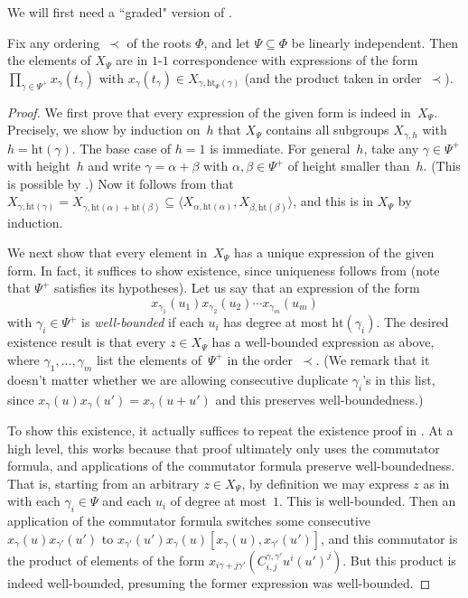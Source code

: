 \documentclass[11pt]{article}
\newcommand{\hgt}{{\mathrm{ht}}}
\begin{document}
We will first need a ``graded" version of .
\begin{proposition}\label{substruct}
    Fix any ordering~$\prec$ of the roots $\Phi$, and let $\Psi \subseteq \Phi$ be linearly independent.  Then the elements of $X_{\Psi}$ are in $1$-$1$ correspondence with expressions of the form $\prod_{\gamma \in \Psi^+} x_{\gamma}(t_\gamma)$ with  $x_\gamma(t_\gamma) \in X_{\gamma,\hgt_\Psi(\gamma)}$ (and the product taken in order~$\prec$).
\end{proposition}
\begin{proof}
    We first prove that every expression of the given form is indeed in~$X_\Psi$.  Precisely, we show by induction on~$h$ that $X_\Psi$ contains all subgroups $X_{\gamma,h}$ with $h = \hgt(\gamma)$.
    The base case of $h = 1$ is immediate.
    For general~$h$, take any $\gamma \in \Psi^+$ with height~$h$ and write $\gamma = \alpha + \beta$ with $\alpha,\beta \in \Psi^+$ of height smaller than~$h$.  (This is possible by .)  Now it follows from  that $X_{\gamma,\hgt(\gamma)} = X_{\gamma,\hgt(\alpha)+\hgt(\beta)} \subseteq \langle X_{\alpha, \hgt(\alpha)}, X_{\beta, \hgt(\beta)} \rangle$, and this is in $X_\Psi$ by induction.  

    We next show that every element in~$X_\Psi$ has a unique expression of the given form.
    In fact, it suffices to show existence, since uniqueness follows from  (note that $\Psi^+$ satisfies its hypotheses). 
    Let us say that an expression of the form
    \begin{equation}    \label{eqn:wellb}
        x_{\gamma_1}(u_1) x_{\gamma_2}(u_2)\cdots x_{\gamma_m}(u_m)
    \end{equation}
    with $\gamma_i \in \Psi^+$ is \emph{well-bounded} if each $u_i$ has degree at most $\hgt(\gamma_i)$.
    The desired existence result is that every $z \in X_{\Psi}$ has a well-bounded expression as above, where $\gamma_1, \dots, \gamma_m$ list the elements of~$\Psi^+$ in the order~$\prec$.  (We remark that it doesn't matter whether we are allowing consecutive duplicate $\gamma_i$'s in this list, since $x_{\gamma}(u) x_{\gamma}(u') = x_{\gamma}(u+u')$ and this preserves well-boundedness.)

    To show this existence, it actually suffices to repeat the existence proof in .  At a high level, this works because that proof ultimately only uses the commutator formula, and applications of the commutator formula preserve well-boundedness.  That is, starting from an arbitrary $z \in X_\Psi$, by definition we may express $z$ as in  with each $\gamma_i \in \Psi$ and each $u_i$ of degree at most~$1$.  This is well-bounded.  Then  an application of the commutator formula switches some  consecutive $x_{\gamma}(u)x_{\gamma'}(u')$ to $x_{\gamma'}(u')x_{\gamma}(u)[x_{\gamma}(u),x_{\gamma'}(u')]$, and this commutator is the product of elements of the form $x_{i\gamma + j \gamma'}(C_{i,j}^{\gamma,\gamma'} u^i (u')^j)$.  But this product is indeed well-bounded, presuming the former expression was well-bounded.


\end{proof}
\end{document}
